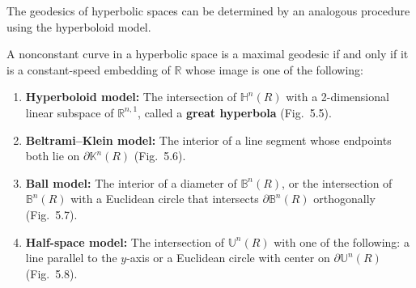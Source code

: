 
The geodesics of hyperbolic spaces can be determined by an analogous procedure using the hyperboloid model.

\begin{proposition}
\label{prop:geodesics-hyperbolic-spaces}

A nonconstant curve in a hyperbolic space is a maximal geodesic if and only if it is a constant-speed embedding of $\mathbb{R}$ whose image is one of the following:
\begin{enumerate}
\item[(a)] \textbf{Hyperboloid model:} The intersection of $\mathbb{H}^n(R)$ with a 2-dimensional linear subspace of $\mathbb{R}^{n,1}$, called a \textbf{great hyperbola} (Fig.\ 5.5).
\item[(b)] \textbf{Beltrami--Klein model:} The interior of a line segment whose endpoints both lie on $\partial\mathbb{K}^n(R)$ (Fig.\ 5.6).
\item[(c)] \textbf{Ball model:} The interior of a diameter of $\mathbb{B}^n(R)$, or the intersection of $\mathbb{B}^n(R)$ with a Euclidean circle that intersects $\partial \mathbb{B}^n(R)$ orthogonally (Fig.\ 5.7).
\item[(d)] \textbf{Half-space model:} The intersection of $\mathbb{U}^n(R)$ with one of the following: a line parallel to the $y$-axis or a Euclidean circle with center on $\partial \mathbb{U}^n(R)$ (Fig.\ 5.8).
\end{enumerate}
\end{proposition}


